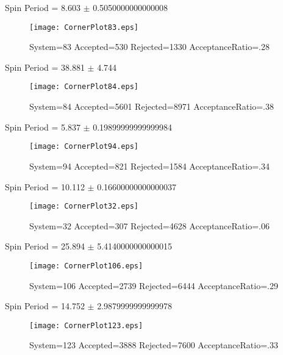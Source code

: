\documentclass[10pt]{article}
\begin{document}
\newpage
\begin{center}
        Spin Period = 8.603 $\pm$ 0.5050000000000008
        \end{center}
\begin{figure}[h] 
        \texttt{[image: CornerPlot83.eps]}
        \caption{System=83 Accepted=530 Rejected=1330 AcceptanceRatio=.28}
        \label{S83}
        \centering
        \end{figure}
\newpage
\begin{center}
        Spin Period = 38.881 $\pm$ 4.744
        \end{center}
\begin{figure}[h] 
        \texttt{[image: CornerPlot84.eps]}
        \caption{System=84 Accepted=5601 Rejected=8971 AcceptanceRatio=.38}
        \label{S84}
        \centering
        \end{figure}
\newpage
\begin{center}
        Spin Period = 5.837 $\pm$ 0.19899999999999984
        \end{center}
\begin{figure}[h] 
        \texttt{[image: CornerPlot94.eps]}
        \caption{System=94 Accepted=821 Rejected=1584 AcceptanceRatio=.34}
        \label{S94}
        \centering
        \end{figure}
\newpage
\begin{center}
        Spin Period = 10.112 $\pm$ 0.16600000000000037
        \end{center}
\begin{figure}[h] 
        \texttt{[image: CornerPlot32.eps]}
        \caption{System=32 Accepted=307 Rejected=4628 AcceptanceRatio=.06}
        \label{S32}
        \centering
        \end{figure}
\newpage
\begin{center}
        Spin Period = 25.894 $\pm$ 5.4140000000000015
        \end{center}
\begin{figure}[h] 
        \texttt{[image: CornerPlot106.eps]}
        \caption{System=106 Accepted=2739 Rejected=6444 AcceptanceRatio=.29}
        \label{S106}
        \centering
        \end{figure}
\newpage
\begin{center}
        Spin Period = 14.752 $\pm$ 2.9879999999999978
        \end{center}
\begin{figure}[h] 
        \texttt{[image: CornerPlot123.eps]}
        \caption{System=123 Accepted=3888 Rejected=7600 AcceptanceRatio=.33}
        \label{S123}
        \centering
        \end{figure}
\end{document}
